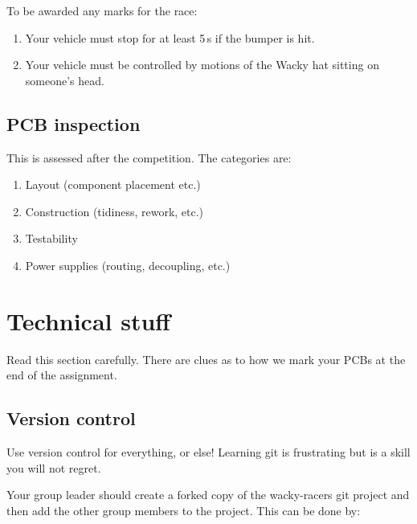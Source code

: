 \documentclass[11pt, a4paper]{article}
\begin{document}
To be awarded any marks for the race:
%
\begin{enumerate}
\item Your vehicle must stop for at least 5\,s if the bumper is hit.

\item Your vehicle must be controlled by motions of the Wacky hat
  sitting on someone's head.
\end{enumerate}


\subsection{PCB inspection}

This is assessed after the competition.  The categories are:
%
\begin{enumerate}
\item Layout (component placement etc.)
\item Construction (tidiness, rework, etc.)
\item Testability
\item Power supplies (routing, decoupling, etc.)
\end{enumerate}



\section{Technical stuff}

Read this section carefully.  There are clues as to how we mark your PCBs at the
end of the assignment.


\subsection{Version control}

Use version control for everything, or else!  Learning git is frustrating but is
a skill you will not regret.

Your group leader should create a forked copy of the wacky-racers git project
and then add the other group members to the project.  This can be done by:
\end{document}

